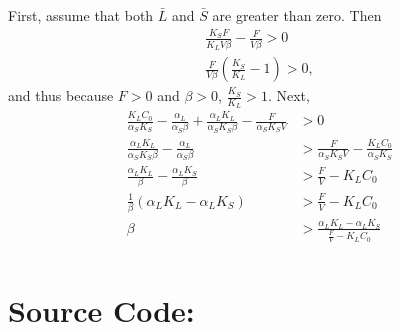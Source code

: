 First, assume that both $\bar{L}$ and $\bar{S}$ are greater than zero.  Then
\begin{align*}
  \frac{K_S F}{K_L V \beta} - \frac{F}{V \beta} > 0 \\
  \frac{F}{V \beta} \left( \frac{K_S}{K_L} - 1 \right) > 0,
\end{align*}
and thus because $F > 0$ and $\beta > 0$, $\frac{K_S}{K_L} > 1$.  Next, 
\begin{align*}
  \frac{K_L C_0}{\alpha_S K_S} - \frac{\alpha_L}{\alpha_S \beta} + \frac{\alpha_L K_L}{\alpha_S K_S \beta} - \frac{F}{\alpha_S K_S V} &> 0 \\
  \frac{\alpha_L K_L}{\alpha_S K_S \beta} - \frac{\alpha_L}{\alpha_S \beta} &> \frac{F}{\alpha_S K_S V} - \frac{K_L C_0}{\alpha_S K_S} \\
  \frac{\alpha_L K_L}{\beta} - \frac{\alpha_L K_S}{\beta} &> \frac{F}{V} - K_L C_0 \\
  \frac{1}{\beta} \left( \alpha_L K_L - \alpha_L K_S \right) &> \frac{F}{V} - K_L C_0 \\
  \beta &> \frac{\alpha_L K_L - \alpha_L K_S}{\frac{F}{V} - K_L C_0} \\
\end{align*}

\newpage

\section*{Source Code:}





